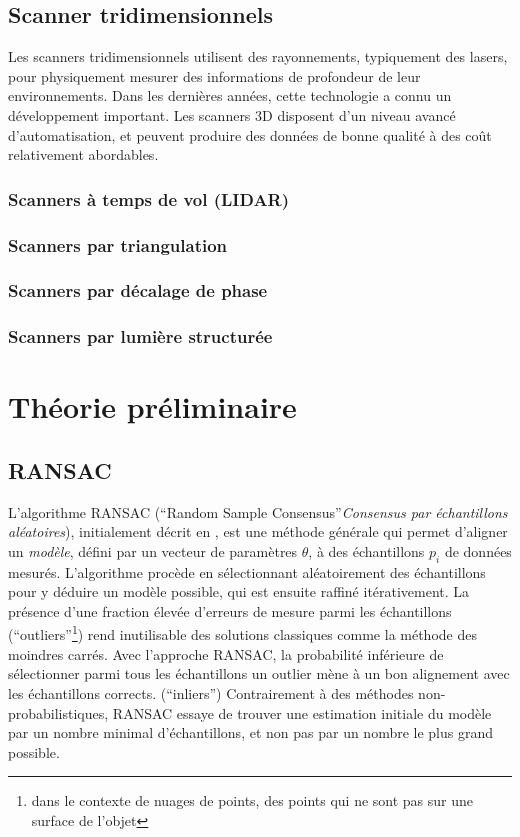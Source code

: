 \documentclass[a4paper,10pt]{scrreprt}
\begin{document}
\subsection{Scanner tridimensionnels}
Les scanners tridimensionnels utilisent des rayonnements, typiquement des lasers, pour physiquement mesurer des informations de profondeur de leur environnements. Dans les dernières années, cette technologie a connu un développement important. Les scanners 3D disposent d'un niveau avancé d'automatisation, et peuvent produire des données de bonne qualité \cite{Grus2012} à des coût relativement abordables.

\subsubsection{Scanners à temps de vol (LIDAR)}
\subsubsection{Scanners par triangulation}
\subsubsection{Scanners par décalage de phase}
\subsubsection{Scanners par lumière structurée}


\section{Théorie préliminaire}

\subsection{RANSAC}
L'algorithme RANSAC (``Random Sample Consensus''\emph{Consensus par échantillons aléatoires}), initialement décrit en \cite{Fisc1980}, est une méthode générale qui permet d'aligner un \emph{modèle}, défini par un vecteur de paramètres $\theta$, à des échantillons $p_i$ de données mesurés. L'algorithme procède en sélectionnant aléatoirement des échantillons pour y déduire un modèle possible, qui est ensuite raffiné itérativement. La présence d'une fraction élevée d'erreurs de mesure parmi les échantillons (``outliers''\footnote{dans le contexte de nuages de points, des points qui ne sont pas sur une surface de l'objet}) rend inutilisable des solutions classiques comme la méthode des moindres carrés. Avec l'approche RANSAC, la probabilité inférieure de sélectionner parmi tous les échantillons un outlier mène à un bon alignement avec les échantillons corrects. (``inliers'') Contrairement à des méthodes non-probabilistiques, RANSAC essaye de trouver une estimation initiale du modèle par un nombre minimal d'échantillons, et non pas par un nombre le plus grand possible.
\end{document}
